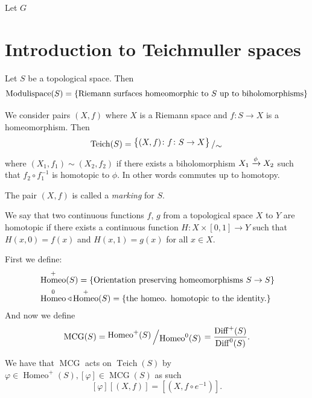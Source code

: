 \documentclass[11pt,a4paper]{article}
\DeclareMathOperator{\Homeo}{Homeo}
\DeclareMathOperator{\Diff}{Diff}
\DeclareMathOperator{\MCG}{MCG}
\DeclareMathOperator{\Teich}{Teich}
\begin{document}
\begin{definition}
  Let $G$
\end{definition}

\newpage

\section{Introduction to Teichmuller spaces}
Let $S$ be a topological space.
Then
\[
  \mathrm{Modulispace}(S) = 
  \left\{\text{Riemann surfaces homeomorphic to $S$ up to biholomorphisms}\right\}
\]
\begin{definition}
  We consider pairs $(X,f)$ where $X$ is a Riemann space and
  $f \colon S \to X$ is a homeomorphism.
  Then
  \[
    \mathrm{Teich}(S) = 
    \bigslant{\set{(X,f) \colon f \colon S \to X}}{\sim}
  \]
  where $(X_1,f_1) \sim (X_2,f_2)$ if there exists a biholomorphism 
  $X_1 \xrightarrow{\phi} X_2$ such that $f_2 \circ f_1^{-1}$ is homotopic to
  $\phi$.
  In other words
  commutes up to homotopy.
\end{definition}

\begin{remark}
  The pair $(X,f)$ is called a \emph{marking} for $S$.
\end{remark}

\begin{definition}[Homotopy]
  We say that two continuous functions $f$, $g$ from a topological space $X$
  to $Y$ are homotopic if there exists a continuous function 
  $H \colon X \times [0,1] \to Y$ such that $H(x,0) = f(x)$ and
  $H(x,1) = g(x)$ for all $x \in X$.
\end{definition}

\begin{definition}
  First we define:
  \begin{align*}
    &\Homeo^+(S) = \set{\text{Orientation preserving homeomorphisms
    $S \to S$}} \\
    &\Homeo^0 \triangleleft \Homeo^+(S) = \set{
      \text{the homeo. homotopic to the identity.}}
  \end{align*}
  And now we define
  \[
    \MCG(S) = \bigslant{\Homeo^+(S)}{\Homeo^0(S)} =
    \frac{\Diff^+(S)}{\Diff^0(S)}.
  \]
\end{definition}

We have that $\MCG$ acts on $\Teich(S)$ by $\varphi \in \Homeo^+(S),
[\varphi] \in \MCG(S)$
as such
\[
  [\varphi] [(X,f)] = [(X,f \circ e^{-1})].
\]
\end{document}
